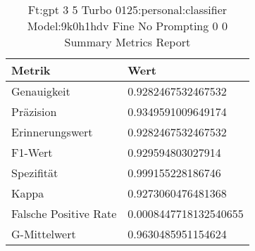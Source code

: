 
    \begin{table}[!ht]
        \centering
        \begin{tabularx}{\textwidth}{X l}
\toprule
\textbf{Metrik} & \textbf{Wert} \\
\midrule
Genauigkeit & \num{0.9282467532467532} \\
Präzision & \num{0.9349591009649174} \\
Erinnerungswert & \num{0.9282467532467532} \\
F1-Wert & \num{0.929594803027914} \\
Spezifität & \num{0.999155228186746} \\
Kappa & \num{0.9273060476481368} \\
Falsche Positive Rate & \num{0.0008447718132540655} \\
G-Mittelwert & \num{0.9630485951154624} \\
\bottomrule
\end{tabularx}

        \caption{Ft:gpt 3 5 Turbo 0125:personal:classifier Model:9k0h1hdv Fine No Prompting 0 0 Summary Metrics Report}
        \label{tab:ft:gpt-3-5-turbo-0125:personal:classifier-model:9k0H1hdV-fine-no-prompting-0-0-summary-metrics-report}
    \end{table}
    